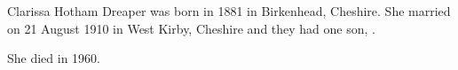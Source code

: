 
Clarissa Hotham Dreaper was born in 1881 in Birkenhead, Cheshire.
She married  on 21 August 1910 in West Kirby, Cheshire\cite{CheshireParishRegisters} and they had one son, .

She died in 1960.
